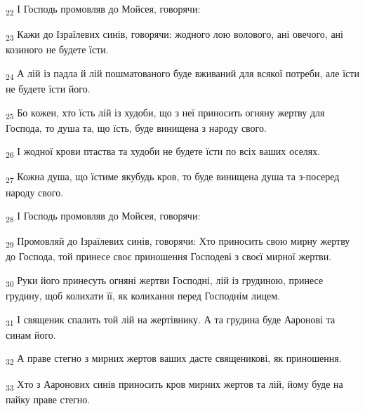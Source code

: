 \begin{tcolorbox}
\textsubscript{22} І Господь промовляв до Мойсея, говорячи:
\end{tcolorbox}
\begin{tcolorbox}
\textsubscript{23} Кажи до Ізраїлевих синів, говорячи: жодного лою волового, ані овечого, ані козиного не будете їсти.
\end{tcolorbox}
\begin{tcolorbox}
\textsubscript{24} А лій із падла й лій пошматованого буде вживаний для всякої потреби, але їсти не будете їсти його.
\end{tcolorbox}
\begin{tcolorbox}
\textsubscript{25} Бо кожен, хто їсть лій із худоби, що з неї приносить огняну жертву для Господа, то душа та, що їсть, буде винищена з народу свого.
\end{tcolorbox}
\begin{tcolorbox}
\textsubscript{26} І жодної крови птаства та худоби не будете їсти по всіх ваших оселях.
\end{tcolorbox}
\begin{tcolorbox}
\textsubscript{27} Кожна душа, що їстиме якубудь кров, то буде винищена душа та з-посеред народу свого.
\end{tcolorbox}
\begin{tcolorbox}
\textsubscript{28} І Господь промовляв до Мойсея, говорячи:
\end{tcolorbox}
\begin{tcolorbox}
\textsubscript{29} Промовляй до Ізраїлевих синів, говорячи: Хто приносить свою мирну жертву до Господа, той принесе своє приношення Господеві з своєї мирної жертви.
\end{tcolorbox}
\begin{tcolorbox}
\textsubscript{30} Руки його принесуть огняні жертви Господні, лій із грудиною, принесе грудину, щоб колихати її, як колихання перед Господнім лицем.
\end{tcolorbox}
\begin{tcolorbox}
\textsubscript{31} І священик спалить той лій на жертівнику. А та грудина буде Ааронові та синам його.
\end{tcolorbox}
\begin{tcolorbox}
\textsubscript{32} А праве стегно з мирних жертов ваших дасте священикові, як приношення.
\end{tcolorbox}
\begin{tcolorbox}
\textsubscript{33} Хто з Ааронових синів приносить кров мирних жертов та лій, йому буде на пайку праве стегно.
\end{tcolorbox}
